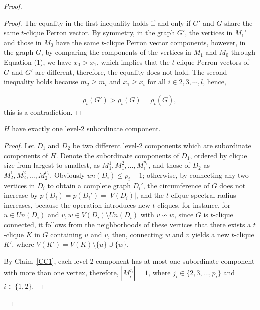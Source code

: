 \documentclass[10pt,a4paper]{amsart}
\begin{document}
\begin{proof}
\begin{proof}
                The equality in the first inequality holds if and only if $G'$ and $G$ share the same $t$-clique Perron vector.
                By symmetry, in the graph $G'$, the vertices in $M_1'$ and those in $M_0$ have the same $t$-clique Perron vector components,
                however, in the graph $G$, by comparing the components of the vertices in $M_1 $ and $M_0 $ through Equation (1), we have $x_0 > x_1$, which implies that the $t$-clique Perron vectors of $G$ and $G'$ are different, therefore, the equality does not hold. The second inequality holds because $m_2 \geq m_i$ and $x_1 \geq x_i$ for all $i \in {2, 3, \cdots, l}$, hence,

                    \begin{align*}
                        \rho_t(G') > \rho_t(G) = \rho_t(\bar{G}),
                    \end{align*}
                this is a contradiction.
            \end{proof}


            \begin{claim}\label{CC2}
                $H$ have exactly one level-2 subordinate component.
            \end{claim}

            \begin{proof}

                Let $D_1$ and $D_2$ be two different level-2 components which are subordinate components of $H$. Denote the subordinate components of $D_1$, ordered by clique size from largest to smallest, as $M_1^1, M_1^2, \ldots, M_1^{p_1}$, and those of $D_2$ as $M_2^1, M_2^2, \ldots, M_2^{p_2}$.
                Obviously $un(D_i) \leq p_i - 1$; otherwise, by connecting any two vertices in $D_i$ to obtain a  complete graph $D_i'$, the circumference of $G$ does not increase by $p(D_i)=p(D_i')=|V(D_i)|$, and the $t$-clique spectral radius increases, because the operation introduces new $t$-cliques, for instance, for $u \in Un(D_i)$ and $v, w \in V(D_i) \setminus Un(D_i)$ with $v \nsim w$, since $G$ is $t$-clique connected, it follows from the neighborhoods of these vertices that there exists a $t$-clique $K$ in $G$ containing $u$ and $v$, then, connecting $w$ and $v$ yields a new $t$-clique $K'$, where $V(K') = V(K) \setminus \{u\} \cup \{w\}$.

                By Claim~\ref{CC1}, each level-2 component has at most one subordinate component with more than one vertex, therefore, $|M_i^{j_i}| = 1$, where $j_i \in \{2,3,\ldots,p_i\}$ and $i \in \{1,2\}$.


\end{proof}
\end{proof}
\end{document}

